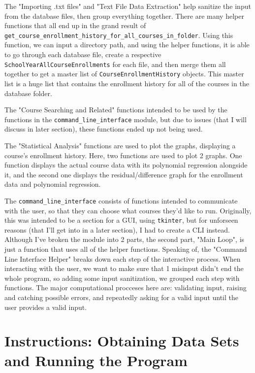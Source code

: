 \documentclass[fontsize=11pt]{article}
\begin{document}
The "Importing .txt files" and "Text File Data Extraction" help sanitize the input from the database files,
then group everything together. There are many helper functions that all end up in the grand result of
\texttt{get\_course\_enrollment\_history\_for\_all\_courses\_in\_folder}.
Using this function, we can input a directory path, and using the helper functions, it is able to
go through each database file, create a respective \texttt{SchoolYearAllCourseEnrollments} for each file,
and then merge them all together to get a master list of \texttt{CourseEnrollmentHistory} objects.
This master list is a huge list that contains the enrollment history for all of the courses in the database folder.

The "Course Searching and Related" functions intended to be used by the functions in the \texttt{command\_line\_interface}
module, but due to issues (that I will discuss in later section), these functions ended up not being used.

The "Statistical Analysis" functions are used to plot the graphs, displaying a course's enrollment history.
Here, two functions are used to plot 2 graphs. One function displays the actual course data with its
polynomial regression alongside it, and the second one displays the residual/difference graph for the
enrollment data and polynomial regression.

The \texttt{command\_line\_interface} consists of functions intended to communicate with the user,
so that they can choose what courses they'd like to run.
Originally, this was intended to be a section for a GUI, using \texttt{tkinter}, but for unforseen
reasons (that I'll get into in a later section), I had to create a CLI instead. Although I've broken
the module into 2 parts, the second part, "Main Loop", is just a function that uses all of the
helper functions. Speaking of, the "Command Line Interface Helper" breaks down each step of the
interactive process. When interacting with the user, we want to make sure that 1 misinput didn't
end the whole program, so adding some input sanitization, we grouped each step with functions.
The major computational procceses here are: validating input, raising and catching possible errors,
and repeatedly asking for a valid input until the user provides a valid input.

\section*{Instructions: Obtaining Data Sets and Running the Program}
\end{document}
